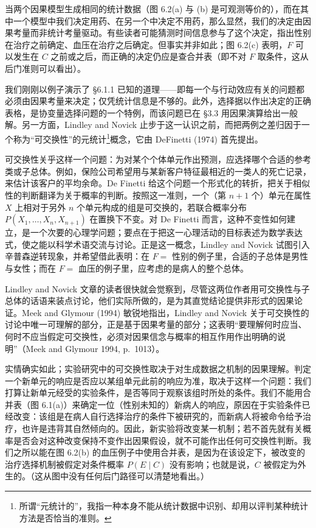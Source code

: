 当两个因果模型生成相同的统计数据（图 6.2(a) 与 (b) 是可观测等价的），而在其中一个模型中我们决定用药、在另一个中决定不用药，那么显然，我们的决定由因果考量而非统计考量驱动。有些读者可能猜测时间信息参与了这个决定，指出性别在治疗之前确定、血压在治疗之后确定。但事实并非如此；图 6.2(c) 表明，$F$ 可以发生在 $C$ 之前或之后，而正确的决定仍应是查合并表（即不对 $F$ 取条件，这从后门准则可以看出）。

我们刚刚以例子演示了 \S 6.1.1 已知的道理——即每一个与行动效应有关的问题都必须由因果考量来决定；仅凭统计信息是不够的。此外，选择据以作出决定的正确表格，是协变量选择问题的一个特例，而该问题已在 \S 3.3 用因果演算给出一般解。另一方面，Lindley and Novick 止步于这一认识之前，而把两例之差归因于一个称为“可交换性”的元统计\footnote{所谓“元统计的”，我指一种本身不能从统计数据中识别、却用以评判某种统计方法是否恰当的准则。}概念，它由 DeFinetti (1974) 首先提出。

可交换性关乎这样一个问题：为对某个个体单元作出预测，应选择哪个合适的参考类或子总体。例如，保险公司希望用与某新客户特征最相近的一类人的死亡记录，来估计该客户的平均余命。De Finetti 给这个问题一个形式化的转折，把关于相似性的判断翻译为关于概率的判断。按照这一准则，一个（第 $n+1$ 个）单元在属性 $X$ 上相对于另外 $n$ 个单元构成的组是可交换的，若联合概率分布 $P(X_1,\dots,X_n,X_{n+1})$ 在置换下不变。对 De Finetti 而言，这种不变性如何建立，是一个次要的心理学问题；要点在于把这一心理活动的目标表述为数学表达式，使之能以科学术语交流与讨论。正是这一概念，Lindley and Novick 试图引入辛普森逆转现象，并希望借此表明：在 $F=$ 性别的例子里，合适的子总体是男性与女性；而在 $F=$ 血压的例子里，应考虑的是病人的整个总体。

Lindley and Novick 文章的读者很快就会觉察到，尽管这两位作者用可交换性与子总体的话语来装点讨论，他们实际所做的，是为其直觉结论提供非形式的因果论证。Meek and Glymour (1994) 敏锐地指出，Lindley and Novick 关于可交换性的讨论中唯一可理解的部分，正是基于因果考量的部分；这表明“要理解何时应当、何时不应当假定可交换性，必须对因果信念与概率的相互作用作出明确的说明”（Meek and Glymour 1994, p.~1013）。

实情确实如此；实验研究中的可交换性取决于对生成数据之机制的因果理解。判定一个新单元的响应是否应以某组单元此前的响应为准，取决于这样一个问题：我们打算让新单元经受的实验条件，是否等同于观察该组时所处的条件。我们不能用合并表（图 6.1(a)）来确定一位（性别未知的）新病人的响应，原因在于实验条件已经改变：该组是在病人自行选择治疗的条件下被研究的，而新病人将被命令给予治疗，也许是违背其自然倾向的。因此，新实验将改变某一机制；若不首先就有关概率是否会对这种改变保持不变作出因果假设，就不可能作出任何可交换性判断。我们之所以能在图 6.2(b) 的血压例子中使用合并表，是因为在该设定下，被改变的治疗选择机制被假定对条件概率 $P(E\mid C)$ 没有影响；也就是说，$C$ 被假定为外生的。（这从图中没有任何后门路径可以清楚地看出。）

